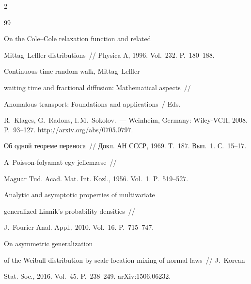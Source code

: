 \begin{multicols}{2}
{{\begin{thebibliography}{99}


 On the Cole--Cole relaxation function and related 


Mittag--Leffler distributions~// Physica A, 1996. Vol.~232. P.~180--188.







 Continuous time random walk, Mittag--Leffler 


waiting time and fractional diffusion: Mathematical aspects~// 


 Anomalous transport: Foundations and applications~/ Eds. 


 R.~Klages, G.~Radons, I.\,M.~Sokolov.~--- Weinheim, Germany: Wiley-VCH, 2008. P.~93--127. http://arxiv.org/abs/0705.0797.







 Об одной теореме переноса~// Докл. АН СССР, 1969. Т.~187. Вып.~1. С.~15--17.







 A~Poisson-folyamat egy jellemzese~// 


Maguar Tud. Acad. Mat. Int. Kozl., 1956. Vol.~1. P.~519--527.







 Analytic and asymptotic properties of multivariate


 generalized Linnik's probability densities~// 


 J.~Fourier Anal. Appl., 2010. Vol.~16. P.~715--747.







 On asymmetric generalization 


of the Weibull distribution by scale-location mixing of normal laws~// J.~Korean 


Stat. Soc., 2016. Vol.~45. P.~238--249. arXiv:1506.06232.






\end{thebibliography}}}
\end{multicols}
